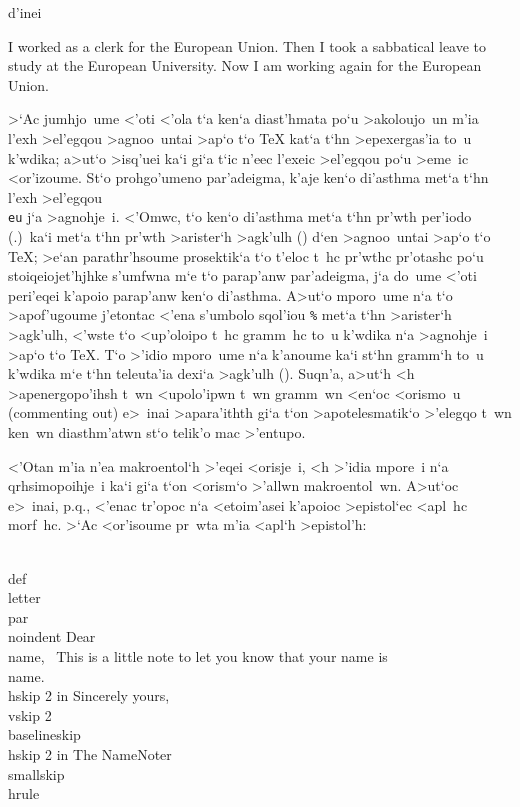 \noindent d'inei

{\rm
\def\eu{European Union}
I worked as a clerk for the \eu.
{
\def\eu{European University}
Then I took a sabbatical leave to study at the \eu.
}
Now I am working again for the \eu.
} %

>`Ac jumhjo~ume <'oti <'ola t`a ken`a diast'hmata po`u >akoloujo~un m'ia
l'exh >el'egqou >agnoo~untai >ap`o t`o {\rm\TeX} kat`a t`hn
>epexergas'ia to~u k'wdika; a>ut`o >isq'uei ka`i gi`a t`ic n'eec l'exeic
>el'egqou po`u >eme~ic <or'izoume.  St`o prohgo'umeno par'adeigma, k'aje
ken`o di'asthma met`a t`hn l'exh >el'egqou {\tt\\eu} j`a >agnohje~i.
<'Omwc, t`o ken`o di'asthma met`a t`hn pr'wth per'iodo (.)\ ka`i met`a
t`hn pr'wth >ari\-ste\-r`h >agk'ulh ({\tt\lb}) d`en >agnoo~untai >ap`o
t`o {\rm \TeX}\null; >e`an parathr'hsoume prosektik`a t`o t'eloc t~hc
pr'wthc pr'otashc po`u stoiqeiojet'hjhke s'umfwna m`e t`o parap'anw
par'adeigma, j`a do~ume <'oti peri'eqei k'apoio parap'anw ken`o
di'asthma.  A>ut`o mporo~ume n`a t`o >apof'ugoume j'etontac <'ena
s'umbolo sqol'iou {\tt \%} met`a t`hn >ari\-ste\-r`h >agk'ulh, <'wste
t`o <up'oloipo t~hc gramm~hc to~u k'wdika n`a >agnohje~i >ap`o t`o {\rm
\TeX}\null.  T`o >'idio mporo~ume n`a k'anoume ka`i st`hn gramm`h to~u
k'wdika m`e t`hn teleuta'ia dexi`a >agk'ulh ({\tt\rb})\null.  Suqn'a,
a>ut`h <h {\tengs >apenergopo'ihsh\/} t~wn <upolo'ipwn t~wn gramm~wn
<en`oc <orismo~u ({\rm commenting out}) e>~inai >apara'ithth gi`a t`on
>apotelesmatik`o >'elegqo t~wn ken~wn diasthm'atwn st`o telik'o mac
>'entupo.

<'Otan m'ia n'ea makroentol`h >'eqei <orisje~i, <h >'idia mpore~i n`a
qrhsimopoihje~i ka`i gi`a t`on <orism`o >'allwn makroentol~wn.  A>ut`oc
e>~inai, p.q., <'enac tr'opoc n`a <etoim'asei k'apoioc >epistol`ec
<apl~hc morf~hc.  >`Ac <or'isoume pr~wta m'ia <apl`h >epistol'h:

\beginuser
\\def\\letter\lb
\\par \\noindent
Dear \\name,
\
This is a little note to let you know that your name is \\name.
\
\\hskip 2 in Sincerely yours,
\\vskip 2\\baselineskip
\\hskip 2 in The NameNoter
\\smallskip \\hrule
\rb
\enduser


